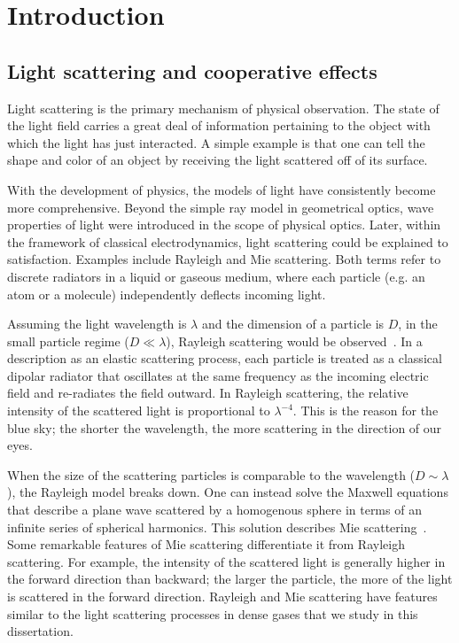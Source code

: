 \chapter{Introduction}

\section{Light scattering and cooperative effects}

Light scattering is the primary mechanism of physical observation. The state of the light field carries a great deal of information pertaining to the object with which the light has just interacted. A simple example is that one can tell the shape and color of an object by receiving the light scattered off of its surface.
 
With the development of physics, the models of light have consistently become more comprehensive. Beyond the simple ray model in geometrical optics, wave properties of light were introduced in the scope of physical optics. Later, within the framework of classical electrodynamics, light scattering could be explained to satisfaction. Examples include Rayleigh and Mie scattering. Both terms refer to discrete radiators in a liquid or gaseous medium, where each particle (e.g. an atom or a molecule) independently deflects incoming light.

Assuming the light wavelength is $\lambda$ and the dimension of a particle is $D$, in the small particle regime ($D\ll\lambda$), Rayleigh scattering would be observed~\cite{Lilienfeld:04}. In a description as an elastic scattering process, each particle is treated as a classical dipolar radiator that oscillates at the same frequency as the incoming electric field and re-radiates the field outward. In Rayleigh scattering, the relative intensity of the scattered light is proportional to $\lambda^{-4}$. This is the reason for the blue sky; the shorter the wavelength, the more scattering in the direction of our eyes.

When the size of the scattering particles is comparable to the wavelength ($D\sim\lambda$), the Rayleigh model breaks down. One can instead solve the Maxwell equations that describe a plane wave scattered by a homogenous sphere in terms of an infinite series of spherical harmonics. This solution describes Mie scattering~\cite{1908AnP...330..377M}.  Some remarkable features of Mie scattering differentiate it from Rayleigh scattering. For example, the intensity of the scattered light is generally higher in the forward direction than backward; the larger the particle, the more of the light is scattered in the forward direction. Rayleigh and Mie scattering have features similar to the light scattering processes in dense gases that we study in this dissertation.

